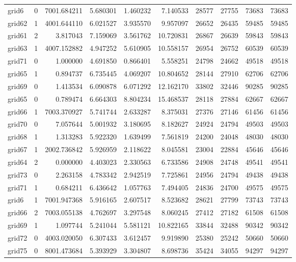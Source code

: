 \begin{longtable}{|l|r|r|r|r|r|r|r|r|r|}
grid6 & 0 & 7001.684211 & 5.680301 & 1.460232 & 7.140533 & 28577 & 27755 & 73683 & 73683 \\
grid62 & 1 & 4001.644110 & 6.021527 & 3.935570 & 9.957097 & 26652 & 26435 & 59485 & 59485 \\
grid61 & 2 & 3.817043 & 7.159069 & 3.561762 & 10.720831 & 26867 & 26639 & 59843 & 59843 \\
grid63 & 1 & 4007.152882 & 4.947252 & 5.610905 & 10.558157 & 26954 & 26752 & 60539 & 60539 \\
grid71 & 0 & 1.000000 & 4.691850 & 0.866401 & 5.558251 & 24798 & 24662 & 49518 & 49518 \\
grid65 & 1 & 0.894737 & 6.735445 & 4.069207 & 10.804652 & 28144 & 27910 & 62706 & 62706 \\
grid69 & 0 & 1.413534 & 6.090878 & 6.071292 & 12.162170 & 33802 & 32446 & 90285 & 90285 \\
grid65 & 0 & 0.789474 & 6.664303 & 8.804234 & 15.468537 & 28118 & 27884 & 62667 & 62667 \\
grid66 & 1 & 7003.370927 & 5.741744 & 2.633287 & 8.375031 & 27376 & 27146 & 61456 & 61456 \\
grid70 & 0 & 7.057644 & 5.001932 & 3.180695 & 8.182627 & 24924 & 24794 & 49503 & 49503 \\
grid68 & 1 & 1.313283 & 5.922320 & 1.639499 & 7.561819 & 24200 & 24048 & 48030 & 48030 \\
grid67 & 1 & 2002.736842 & 5.926959 & 2.118622 & 8.045581 & 23004 & 22884 & 45646 & 45646 \\
grid64 & 2 & 0.000000 & 4.403023 & 2.330563 & 6.733586 & 24908 & 24748 & 49541 & 49541 \\
grid73 & 0 & 2.263158 & 4.783342 & 2.942519 & 7.725861 & 24956 & 24794 & 49438 & 49438 \\
grid71 & 1 & 0.684211 & 6.436642 & 1.057763 & 7.494405 & 24836 & 24700 & 49575 & 49575 \\
grid6 & 1 & 7001.947368 & 5.916165 & 2.607517 & 8.523682 & 28621 & 27799 & 73743 & 73743 \\
grid66 & 2 & 7003.055138 & 4.762697 & 3.297548 & 8.060245 & 27412 & 27182 & 61508 & 61508 \\
grid69 & 1 & 1.097744 & 5.241044 & 5.581121 & 10.822165 & 33844 & 32488 & 90342 & 90342 \\
grid72 & 0 & 4003.020050 & 6.307433 & 3.612457 & 9.919890 & 25380 & 25242 & 50660 & 50660 \\
grid75 & 0 & 8001.473684 & 5.393929 & 3.304807 & 8.698736 & 35424 & 34055 & 94297 & 94297 \\

\end{longtable}
